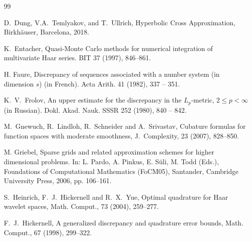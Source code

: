 \documentclass[12pt]{article}
\newcommand{\ZZ}{\mathbb{Z}}
\newcommand{\integer}{\ZZ}
\newcommand{\LL}{\mathcal{L}}
\begin{document}
{\begin{thebibliography}{99}

D.~Dung, V.A.~Temlyakov, and T.~Ullrich, {Hyperbolic Cross Approximation}, Birkh\"auser, Barcelona, 2018.

K.~Entacher, Quasi-Monte Carlo methods for numerical integration of
multivariate Haar series. BIT 37 (1997), 846--861.


H. Faure, Discrepancy of sequences associated with a number system (in dimension $s$) (in French). Acta Arith. 41 (1982), 337 -- 351.

K.~V.~Frolov, An upper estimate for the discrepancy in the $L_p$-metric, $2\le p <\infty$ (in Russian). Dokl. Akad. Nauk. SSSR 252 (1980), 840 -- 842.



 M.~Gnewuch, R.~Lindloh, R.~Schneider and A.~Srivastav,
Cubature formulas for function spaces with moderate smoothness,
J.~Complexity, 23 (2007), 828--850.

M. Griebel, Sparse grids and related approximation schemes for higher dimensional problems. In: L. Pardo, A. Pinkus, E. S\"uli, M. Todd (Eds.), Foundations of Computational Mathematics (FoCM05), Santander, Cambridge University Press, 2006, pp. 106--161.


 S.~Heinrich, F.~J.~Hickernell and R.~X.~Yue, Optimal quadrature for
Haar wavelet spaces, Math. Comput., 73 (2004), 259--277.

 F.~J.~Hickernell, A generalized discrepancy and quadrature error bounds, 
Math. Comput., 67 (1998), 299--322.


\end{thebibliography}}
\end{document}
